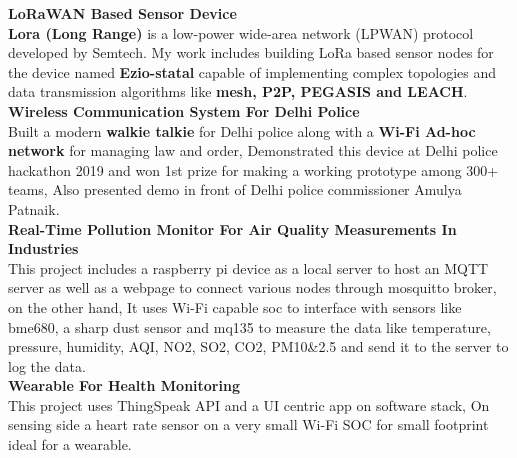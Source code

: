 \documentclass[10pt]{report}
\begin{document}
\noindent\textbf{\large LoRaWAN Based Sensor Device\\[1pt]}
\textbf{Lora (Long Range)} is a low-power wide-area network (LPWAN) protocol developed by Semtech. My work includes building LoRa based sensor nodes for the device named \textbf{Ezio-statal} capable of implementing complex topologies and data transmission algorithms like \textbf{mesh, P2P, PEGASIS and LEACH}. 
\\[4pt]
\noindent\textbf{\large Wireless Communication System For Delhi Police\\[1pt]}
Built a modern \textbf{walkie talkie} for Delhi police along with a \textbf{Wi-Fi Ad-hoc network} for managing law and order, Demonstrated this device at Delhi police hackathon 2019 and won 1st prize for making a working prototype among 300+ teams, Also presented demo in front of Delhi police commissioner Amulya Patnaik.
\\[4pt]
\noindent\textbf{\large Real-Time Pollution Monitor For Air Quality Measurements In Industries\\[1pt] }
This project includes a raspberry pi device as a local server to host an MQTT server as well as a webpage to connect various nodes through mosquitto broker, on the other hand, It uses Wi-Fi capable soc to interface with sensors like bme680, a sharp dust sensor and mq135 to measure the data like temperature, pressure, humidity, AQI, NO2, SO2, CO2, PM10\&2.5 and send it to the server to log the data.
\\[4pt]
\noindent\textbf{\large Wearable For Health Monitoring \\[1pt]}
This project uses ThingSpeak API and a UI centric app on software stack, On sensing side a heart rate sensor on a very small Wi-Fi SOC for small footprint ideal for a wearable.\vspace{-1em}
\end{document}
